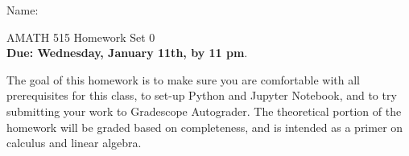 \documentclass[11pt]{amsart}
\begin{document}
{\Large Name:}  \\
\begin{center}
\Large AMATH 515 \hskip 2in Homework Set 0\\
{\bf Due:  Wednesday, January 11th, by 11 pm}. 
\end{center}

\bigskip

%
%
%

The goal of this homework is to make sure you are comfortable with all prerequisites for this class, to set-up Python and Jupyter Notebook, and to try submitting your work to Gradescope Autograder. 
The theoretical portion of the homework will be graded based on completeness, and is intended as a primer on calculus and linear algebra. 
\end{document}
